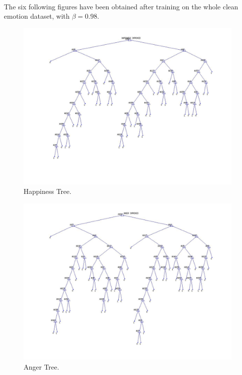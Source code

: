 \documentclass[a4paper,12pt,oneside,final]{report}
\newenvironment{changemargin}[2]{\begin{list}{}{%
\setlength{\topsep}{0pt}%
\setlength{\leftmargin}{0pt}%
\setlength{\rightmargin}{0pt}%
\setlength{\listparindent}{\parindent}%
\setlength{\itemindent}{\parindent}%
\setlength{\parsep}{0pt plus 1pt}%
\addtolength{\leftmargin}{#1}%
\addtolength{\rightmargin}{#2}%
}\item }{\end{list}}
\begin{document}
\begin{appendices}
\paragraph{}
The six following figures have been obtained after training on the whole clean emotion dataset, with $\beta = 0.98$.

\begin{figure}[!h]
\center
\includegraphics[scale=0.35]{happiness_improved.jpg}
\caption{Happiness Tree.}
\end{figure}

\begin{figure}[h]
\begin{changemargin}{-20mm}{-20mm}
\begin{center}
\includegraphics[scale=0.5]{anger_improved.jpg}
\end{center}
\caption{Anger Tree.}
\end{changemargin}
\end{figure}


\end{appendices}
\end{document}
